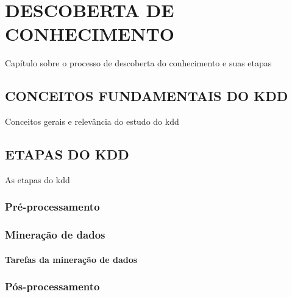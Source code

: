 
\chapter{DESCOBERTA DE CONHECIMENTO}
\label{chap:descobertaConhecimento}
Capítulo sobre o processo de descoberta do conhecimento e suas etapas

\section{CONCEITOS FUNDAMENTAIS DO KDD}
\label{sec:conceitosKDD}
Conceitos gerais e relevância do estudo do kdd

\section{ETAPAS DO KDD}
\label{sec:etapasKDD}
As etapas do kdd

\subsection{Pré-processamento}
\label{subsec:preprocKDD}

\subsection{Mineração de dados}
\label{subsec:mineKDD}

\subsubsection{Tarefas da mineração de dados}


\subsection{Pós-processamento}
\label{subsec:posprocKDD}